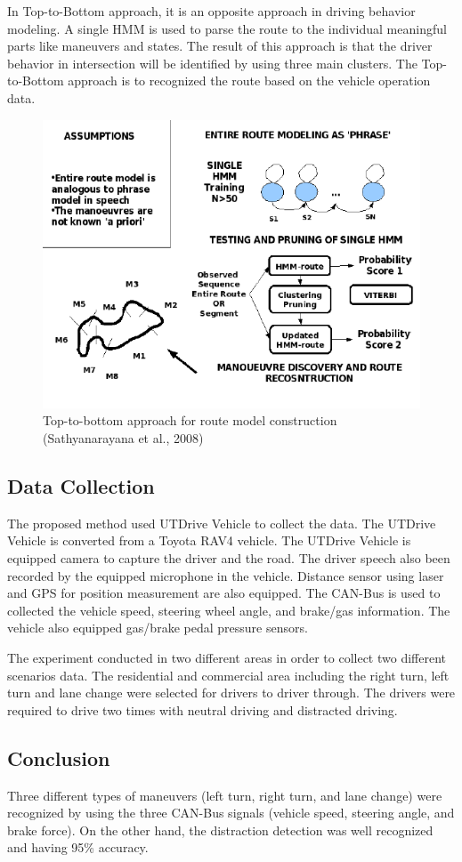 In Top-to-Bottom approach, it is an opposite approach in driving behavior modeling. A single HMM is used to parse the route to the individual meaningful parts like maneuvers and states. The result of this approach is that the driver behavior in intersection will be identified by using three main clusters. The Top-to-Bottom approach is to recognized the route based on the vehicle operation data.

\begin{figure}[hbt!]\centering
\includegraphics[width=.75\textwidth]{image/ToptoBottom}
\caption{Top-to-bottom approach for route model construction (Sathyanarayana et al., 2008)}
\end{figure}

\subsection{Data Collection}
The proposed method used UTDrive Vehicle to collect the data. The UTDrive Vehicle is converted from a Toyota RAV4 vehicle. The UTDrive Vehicle is equipped camera to capture the driver and the road. The driver speech also been recorded by the equipped microphone in the vehicle. Distance sensor using laser and GPS for position measurement are also equipped. The CAN-Bus is used to collected the vehicle speed, steering wheel angle, and brake/gas information. The vehicle also equipped gas/brake pedal pressure sensors. 

The experiment conducted in two different areas in order to collect two different scenarios data. The residential and commercial area including the right turn, left turn and lane change were selected for drivers to driver through. The drivers were required to drive two times with neutral driving and distracted driving. 
 
\subsection{Conclusion}
Three different types of maneuvers (left turn, right turn, and lane change) were recognized by using the three CAN-Bus signals (vehicle speed, steering angle, and brake force). On the other hand, the distraction detection was well recognized and having 95\% accuracy.


